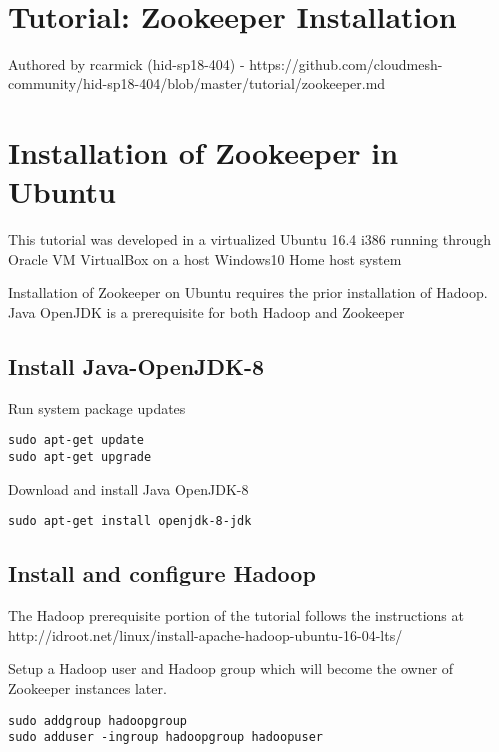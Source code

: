 \MDNAME\

\section{Tutorial: Zookeeper Installation}

Authored by rcarmick (hid-sp18-404) -
https://github.com/cloudmesh-community/hid-sp18-404/blob/master/tutorial/zookeeper.md

\section{Installation of Zookeeper in Ubuntu}

This tutorial was developed in a virtualized Ubuntu 16.4 i386 running
through Oracle VM VirtualBox on a host Windows10 Home host system

Installation of Zookeeper on Ubuntu requires the prior installation of
Hadoop. Java OpenJDK is a prerequisite for both Hadoop and Zookeeper

\subsection{Install Java-OpenJDK-8}

Run system package updates

\begin{lstlisting}
sudo apt-get update
sudo apt-get upgrade
\end{lstlisting}

Download and install Java OpenJDK-8

\begin{lstlisting}
sudo apt-get install openjdk-8-jdk
\end{lstlisting}

\subsection{Install and configure Hadoop}

The Hadoop prerequisite portion of the tutorial follows the instructions
at http://idroot.net/linux/install-apache-hadoop-ubuntu-16-04-lts/

Setup a Hadoop user and Hadoop group which will become the owner of
Zookeeper instances later.

\begin{lstlisting}
sudo addgroup hadoopgroup
sudo adduser -ingroup hadoopgroup hadoopuser
\end{lstlisting}

